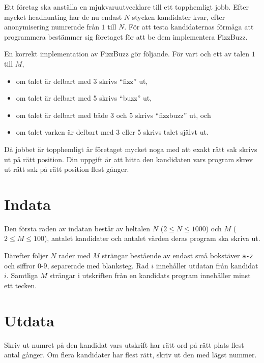 Ett företag ska anställa en mjukvaruutvecklare till ett topphemligt jobb.
Efter mycket headhunting har de nu endast $N$ stycken kandidater kvar, efter anonymisering numrerade från $1$ till $N$.
För att testa kandidaternas förmåga att programmera bestämmer sig företaget för att be dem implementera FizzBuzz.

En korrekt implementation av FizzBuzz gör följande.
För vart och ett av talen $1$ till $M$,
\begin{itemize}
 \item om talet är delbart med 3 skrivs ``fizz'' ut,
 \item om talet är delbart med 5 skrivs ``buzz'' ut,
 \item om talet är delbart med både 3 och 5 skrivs ``fizzbuzz'' ut, och
 \item om talet varken är delbart med 3 eller 5 skrivs talet självt ut. 
\end{itemize}

Då jobbet är topphemligt är företaget mycket noga med att exakt rätt sak skrivs ut på rätt position.
Din uppgift är att hitta den kandidaten vars program skrev ut rätt sak på rätt position flest gånger.

\section*{Indata}
Den första raden av indatan består av heltalen $N$ ($2 \leq N \leq 1000$) och $M$ ($2 \leq M \leq 100$), antalet kandidater och antalet värden deras program ska skriva ut.

Därefter följer $N$ rader med $M$ strängar bestående av endast små bokstäver \texttt{a-z} och siffror $0$-$9$, separerade med blanksteg.
Rad $i$ innehåller utdatan från kandidat $i$.
Samtliga $M$ strängar i utskriften från en kandidats program innehåller minst ett tecken.

\section*{Utdata}
Skriv ut numret på den kandidat vars utskrift har rätt ord på rätt plats flest antal gånger.
Om flera kandidater har flest rätt, skriv ut den med lägst nummer.
